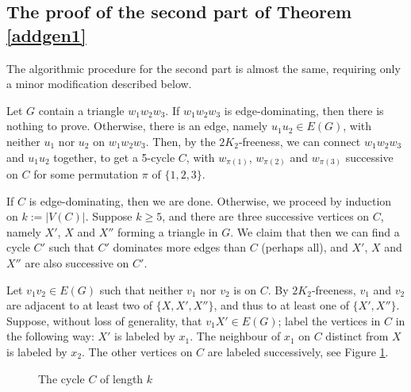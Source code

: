 \documentclass[runningheads,a4paper]{llncs}
\begin{document}
\subsection{The proof of the second part of Theorem  \ref{addgen1}}
The algorithmic procedure for the second part is almost the same, requiring only a minor
modification described below.

Let $G$  contain a triangle $w_1w_2w_3$.
If $w_1w_2w_3$ is edge-dominating, then there is nothing to prove. Otherwise, there is an edge, namely $u_1u_2\in E(G)$, with neither $u_1$ nor $u_2$  on $w_1w_2w_3$. Then, by the $2K_2$-freeness, we can connect $w_1w_2w_3$ and $u_1u_2$ together, to get a 5-cycle $C$, 
with $w_{\pi(1)}$, $w_{\pi(2)}$ and $w_{\pi(3)}$ successive on $C$ for some
permutation $\pi$ of $\{1,2,3\}$. 

If $C$ is edge-dominating, then we are done. Otherwise, we proceed by induction on
$k:=|V(C)|$. 
Suppose $k\ge5$, and there are three successive vertices on $C$, namely $X'$, $X$ and $X''$ forming a triangle in $G$. 
We claim that then we can find a cycle $C'$ such that $C'$ dominates more edges than $C$ (perhaps all), 
and $X'$, $X$ and $X''$ are also successive on $C'$.

Let $v_1v_2\in E(G)$ such that neither $v_1$ nor $v_2$ is on $C$. By $2K_2$-freeness, $v_1$ and $v_2$ are adjacent to at least two of $\{X,X',X''\}$, and thus to at least one of $\{X',X''\}$. Suppose,
without loss of generality, that $v_1X'\in E(G)$; label the vertices in $C$ in the following way:
$X'$ is labeled by $x_1$. The neighbour of $x_1$ on $C$ distinct from $X$ is labeled by $x_2$. 
The other vertices on $C$ are labeled successively, see Figure \ref{labelcycle}.

\begin{figure}[h]
\begin{center}
\end{center}
\caption{The cycle $C$ of length $k$}\label{labelcycle}
\end{figure}
\end{document}
